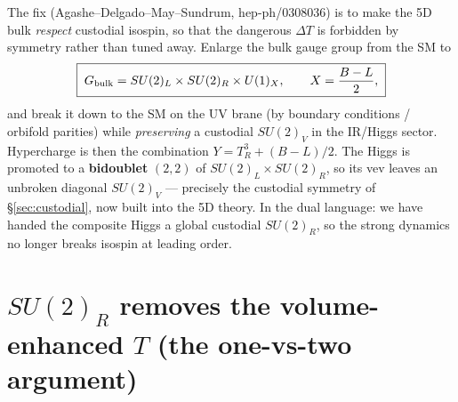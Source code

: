 \documentclass[11pt]{article}
\newcommand{\SUL}{SU(2)_L}
\newcommand{\SUR}{SU(2)_R}
\newcommand{\UX}{U(1)_X}
\theoremstyle{definition}
\begin{document}
The fix (Agashe--Delgado--May--Sundrum, hep-ph/0308036) is to make the 5D bulk
\emph{respect} custodial isospin, so that the dangerous $\Delta T$ is forbidden by
symmetry rather than tuned away. Enlarge the bulk gauge group from the SM to
\begin{equation}
\boxed{\;G_{\rm bulk} = \SUL \times \SUR \times \UX,\qquad X = \frac{B-L}{2},\;}
\label{eq:group}
\end{equation}
and break it down to the SM on the UV brane (by boundary conditions / orbifold
parities) while \emph{preserving} a custodial $SU(2)_V$ in the IR/Higgs sector.
Hypercharge is then the combination $Y = T^3_R + (B-L)/2$. The Higgs is promoted
to a \textbf{bidoublet} $(2,2)$ of $\SUL\times\SUR$, so its vev leaves an
unbroken diagonal $SU(2)_V$ --- precisely the custodial symmetry of
\S\ref{sec:custodial}, now built into the 5D theory. In the dual language: we
have handed the composite Higgs a global custodial $\SUR$, so the strong dynamics
no longer breaks isospin at leading order.

\section{$\SUR$ removes the volume-enhanced $T$ (the one-vs-two argument)}
\label{sec:Tcure}
\end{document}
